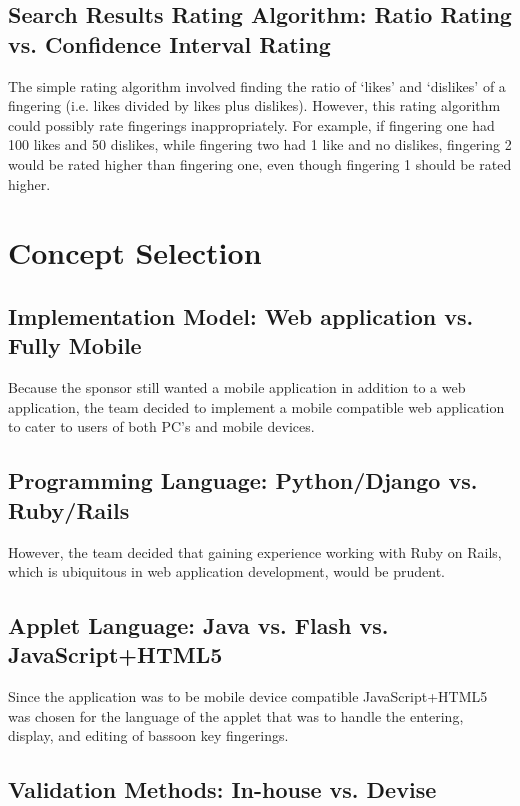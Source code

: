 \documentclass[12pt,english]{article}
\begin{document}
\subsection{Search Results Rating Algorithm: Ratio Rating vs. Confidence Interval
Rating}

The simple rating algorithm involved finding the ratio of `likes'
and `dislikes' of a fingering (i.e. likes divided by likes plus dislikes).
However, this rating algorithm could possibly rate fingerings inappropriately.
For example, if fingering one had 100 likes and 50 dislikes, while
fingering two had 1 like and no dislikes, fingering 2 would be rated
higher than fingering one, even though fingering 1 should be rated
higher.

\section{Concept Selection}


\subsection{Implementation Model: Web application vs. Fully Mobile}

Because the sponsor still wanted a mobile application in addition
to a web application, the team decided to implement a mobile compatible
web application to cater to users of both PC's and mobile devices.


\subsection{Programming Language: Python/Django vs. Ruby/Rails}

However, the team decided that gaining experience working with Ruby
on Rails, which is ubiquitous in web application development, would
be prudent.

\subsection{Applet Language: Java vs. Flash vs. JavaScript+HTML5}

Since the application was to be mobile device compatible JavaScript+HTML5
was chosen for the language of the applet that was to handle the entering,
display, and editing of bassoon key fingerings.

\subsection{Validation Methods: In-house vs. Devise}
\end{document}
